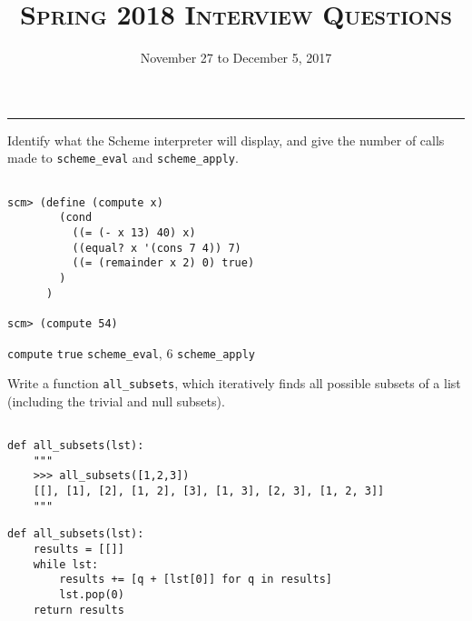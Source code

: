 \documentclass{exam}
\title{\textsc{Spring 2018 Interview Questions}}
\date{November 27 to December 5, 2017}
\begin{document}
\maketitle
\rule{\textwidth}{0.15em}
\fontsize{12}{15}\selectfont

\begin{questions}

\begin{blocksection}
\question Identify what the Scheme interpreter will display, and give the number of calls made to \lstinline$scheme_eval$ and \lstinline$scheme_apply$.
\begin{lstlisting}

scm> (define (compute x) 
        (cond 
          ((= (- x 13) 40) x) 
          ((equal? x '(cons 7 4)) 7) 
          ((= (remainder x 2) 0) true)
        )
      )

scm> (compute 54)

\end{lstlisting}

\begin{solution}
\lstinline$compute$ \linebreak
\lstinline$true$  \lstinline$scheme_eval$, 6 \lstinline$scheme_apply$
\end{solution}

\end{blocksection}

\begin{blocksection}
\question Write a function \lstinline$all_subsets$, which iteratively finds all possible subsets of a list (including the trivial and null subsets).
\begin{lstlisting}

def all_subsets(lst):
    """
    >>> all_subsets([1,2,3])
    [[], [1], [2], [1, 2], [3], [1, 3], [2, 3], [1, 2, 3]]
    """

\end{lstlisting}

\begin{solution}
\begin{lstlisting}
def all_subsets(lst):
    results = [[]]
    while lst:
        results += [q + [lst[0]] for q in results]
        lst.pop(0)
    return results
\end{lstlisting}    
\end{solution}

\end{blocksection}



\end{questions}
\end{document}
